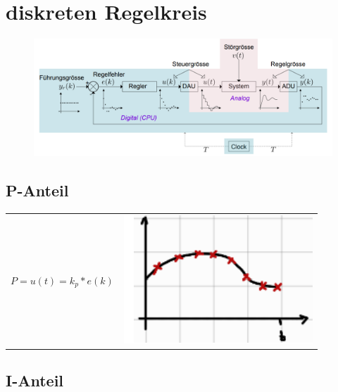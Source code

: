 \documentclass[
  10pt,
  a4paper,
  onecolumn]{article}
\numberwithin{equation}{section}
\begin{document}
\hypertarget{diskreten-regelkreis}{%
\section{diskreten Regelkreis}\label{diskreten-regelkreis}}

\begin{figure}[H]

{\centering \includegraphics{images/IAS/snip1.png}

}

\end{figure}

\hypertarget{p-anteil}{%
\subsection{P-Anteil}\label{p-anteil}}

\begin{longtable}[]{@{}
  >{\raggedright\arraybackslash}p{}
  >{\raggedright\arraybackslash}p{}@{}}
\toprule\noalign{}
\endhead
\bottomrule\noalign{}
\endlastfoot
\(                    
 P = u(t) = k_p * e(k)  
 \) & \includegraphics{images/IAS/P-Anteil.png} \\
\end{longtable}

\hypertarget{i-anteil}{%
\subsection{I-Anteil}\label{i-anteil}}
\end{document}
